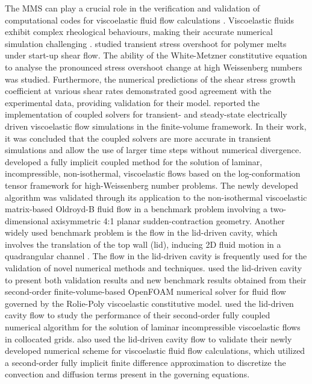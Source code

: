 \documentclass[preprint, 12pt]{elsarticle}
\begin{document}
The MMS can play a crucial role in the verification and validation of
computational codes for viscoelastic fluid flow calculations \cite{Garcia2022}.
Viscoelastic fluids exhibit complex rheological behaviours, making their
accurate numerical simulation challenging \cite{Fernandes2017}.
\citeauthor{Tseng2021} studied transient stress overshoot for polymer melts
under start-up shear flow. The ability of the White-Metzner constitutive
equation to analyse the pronounced stress overshoot change at high Weissenberg
numbers was studied. Furthermore, the numerical predictions of the shear stress
growth coefficient at various shear rates demonstrated good agreement with the
experimental data, providing validation for their model. \citet{Pimenta2019}
reported the implementation of coupled solvers for transient- and steady-state
electrically driven viscoelastic flow simulations in the finite-volume
framework. In their work, it was concluded that the coupled solvers are more
accurate in transient simulations and allow the use of larger time steps
without numerical divergence. \citet{Fernandes2022} developed a fully implicit
coupled method for the solution of laminar, incompressible, non-isothermal,
viscoelastic flows based on the log-conformation tensor framework for
high-Weissenberg number problems. The newly developed algorithm was validated
through its application to the non-isothermal viscoelastic matrix-based
Oldroyd-B fluid flow in a benchmark problem involving a two-dimensional
axisymmetric 4:1 planar sudden-contraction geometry. Another widely used
benchmark problem is the flow in the lid-driven cavity, which involves the
translation of the top wall (lid), inducing 2D fluid motion in a quadrangular
channel \cite{Shankar2000}. The flow in the lid-driven cavity is frequently
used for the validation of novel numerical methods and techniques.
\citet{Abuga2020} used the lid-driven cavity to present both validation results
and new benchmark results obtained from their second-order finite-volume-based
OpenFOAM numerical solver for fluid flow governed by the Rolie-Poly
viscoelastic constitutive model. \citet{Fernandes2019} used the lid-driven
cavity flow to study the performance of their second-order fully coupled
numerical algorithm for the solution of laminar incompressible viscoelastic
flows in collocated grids. \citet{Tomio2020} also used the lid-driven cavity
flow to validate their newly developed numerical scheme for viscoelastic fluid
flow calculations, which utilized a second-order fully implicit finite
difference approximation to discretize the convection and diffusion terms
present in the governing equations.
\end{document}
